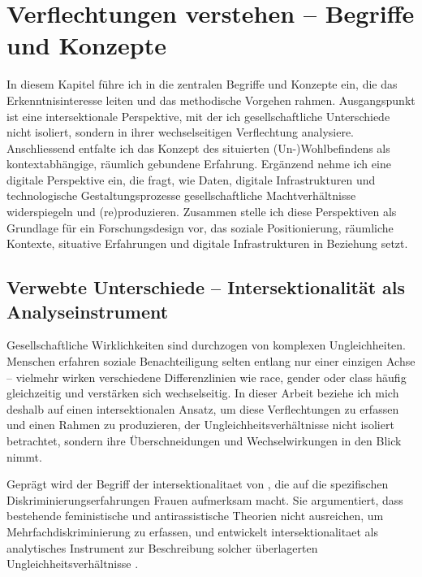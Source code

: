 

\chapter{Verflechtungen verstehen -- Begriffe und Konzepte} \label{sec:theoretischer_rahmen}

In diesem Kapitel führe ich in die zentralen Begriffe und Konzepte ein, die das Erkenntnisinteresse leiten und das methodische Vorgehen rahmen. Ausgangspunkt ist eine intersektionale Perspektive, mit der ich gesellschaftliche Unterschiede nicht isoliert, sondern in ihrer wechselseitigen Verflechtung analysiere. Anschliessend entfalte ich das Konzept des situierten (Un-)Wohlbefindens als kontextabhängige, räumlich gebundene Erfahrung. Ergänzend nehme ich eine digitale Perspektive ein, die fragt, wie Daten, digitale Infrastrukturen und technologische Gestaltungsprozesse gesellschaftliche Machtverhältnisse widerspiegeln und (re)produzieren. Zusammen stelle ich diese Perspektiven als Grundlage für ein Forschungsdesign vor, das soziale Positionierung, räumliche Kontexte, situative Erfahrungen und digitale Infrastrukturen in Beziehung setzt.

\section{Verwebte Unterschiede -- Intersektionalität als Analyseinstrument}

Gesellschaftliche Wirklichkeiten sind durchzogen von komplexen Ungleichheiten. Menschen erfahren soziale Benachteiligung selten entlang nur einer einzigen Achse -- vielmehr wirken verschiedene Differenzlinien wie \gls{race}, \gls{gender} oder \gls{class} häufig gleichzeitig und verstärken sich wechselseitig. In dieser Arbeit beziehe ich mich deshalb auf einen intersektionalen Ansatz, um diese Verflechtungen zu erfassen und einen Rahmen zu produzieren, der Ungleichheitsverhältnisse nicht isoliert betrachtet, sondern ihre Überschneidungen und Wechselwirkungen in den Blick nimmt.

Geprägt wird der Begriff der \gls{intersektionalitaet} von \textcite{crenshawMappingMarginsIntersectionality1991}, die auf die spezifischen Diskriminierungserfahrungen \emph{}\footnotemark Frauen aufmerksam macht. Sie argumentiert, dass bestehende feministische und antirassistische Theorien nicht ausreichen, um Mehrfachdiskriminierung zu erfassen, und entwickelt \gls{intersektionalitaet} als analytisches Instrument zur Beschreibung solcher überlagerten Ungleichheitsverhältnisse \parencite[\gls{vgl}][]{hancockWhenMultiplicationDoesnt2007}.

